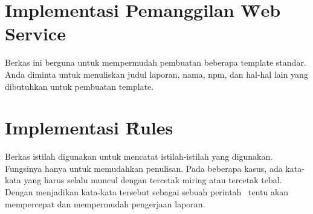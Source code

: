 \section{Implementasi Pemanggilan \f{Web Service}}
Berkas ini berguna untuk mempermudah pembuatan beberapa template standar. 
Anda diminta untuk menuliskan judul laporan, nama, npm, dan hal-hal lain yang 
dibutuhkan untuk pembuatan template. 


\section{Implementasi \f{Rules}}
Berkas istilah digunakan untuk mencatat istilah-istilah yang digunakan. 
Fungsinya hanya untuk memudahkan penulisan.
Pada beberapa kasus, ada kata-kata yang harus selalu muncul dengan tercetak 
miring atau tercetak tebal. 
Dengan menjadikan kata-kata tersebut sebagai sebuah perintah \latex~tentu akan 
mempercepat dan mempermudah pengerjaan laporan. 
